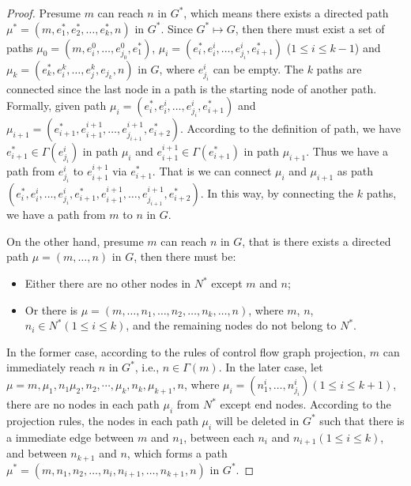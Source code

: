 \begin{proof} Presume $m$ can reach $n$ in $G^*$, which means there exists a directed path $\mu^*=(m,e_1^*,e_2^*,\ldots,e_k^*,n)$ in $G^*$. 
Since $G^* \mapsto G$, then there must exist a set of paths $\mu_0=(m,e^0_i,\ldots,e^0_{j_0}, e_1^*)$, $\mu_i=(e^*_{i}, e^{i}_i,\ldots,e^{i}_{j_i}, e_{i+1}^*)$ ($1\leq i\leq k-1$) and $\mu_k=(e_k^*,e^k_i,\ldots,e^k_j, e_{j_k}, n)$ in $G$, where $e^{i}_{j_i}$ can be empty. The $k$ paths are connected since the last node in a path is the starting node of another path. Formally, given path $\mu_i=(e^*_{i}, e^{i}_i,\ldots,e^{i}_{j_i}, e_{i+1}^*)$ and $\mu_{i+1}=(e^*_{i+1}, e^{i+1}_{i+1},\ldots,e^{i+1}_{j_{i+1}}, e_{i+2}^*)$. According to the definition of path, we have $e_{i+1}^*\in \Gamma(e^{i}_{j_i})$ in path $\mu_i$
and $e^{i+1}_{i+1} \in \Gamma(e^*_{i+1})$ in path $\mu_{i+1}$. Thus we have a path from $e^{i}_{j_i}$ to $e^{i+1}_{i+1}$ via $e^*_{i+1}$. That is we can connect $\mu_i$ and $\mu_{i+1}$ as path $(e^*_{i},e^{i}_i,\ldots,e^{i}_{j_i}, e_{i+1}^*, e^{i+1}_{i+1},\ldots,e^{i+1}_{j_{i+1}}, e_{i+2}^*)$. In this way, by connecting the $k$ paths, we have a path from $m$ to $n$ in $G$.

On the other hand, presume $m$ can reach $n$ in $G$, that is there exists a directed path $\mu=(m,\ldots,n)$ in $G$, then there must be:
\begin{itemize}
\item
Either there are no other nodes in $N^*$ except $m$ and $n$; 
\item
Or there is $\mu=(m,\ldots,n_1,\ldots,n_2,\ldots,n_k,\ldots,n)$, where $m$, $n$, $n_i\in N^* (1\leq i \leq k)$, and the remaining nodes do not belong to $N^*$.
\end{itemize}
%
In the former case, according to the rules of control flow graph projection, $m$ can immediately reach $n$ in $G^*$, i.e., $n\in \Gamma(m)$.
%
In the later case, let $\mu=m,\mu_1,n_1\mu_2, n_2,\cdots,\mu_k, n_k, \mu_{k+1}, n$, where $\mu_i=(n^i_{1},\ldots,n^i_{j_i}) (1\leq i\leq k+1)$, there are no nodes in each path $\mu_i$ from $N^*$ except end nodes. According to the projection rules, the nodes in each path $\mu_i$ will be deleted in $G^*$ such that there is a immediate edge between $m$ and $n_1$, between each $n_i$ and $n_{i+1} (1\leq i \leq k)$, and between $n_{k+1}$ and $n$, which forms a path $
\mu^*=(m, n_1, n_2, \ldots, n_{i}, n_{i+1}, \ldots, n_{k+1}, n)$ in $G^*$. 
\end{proof}

